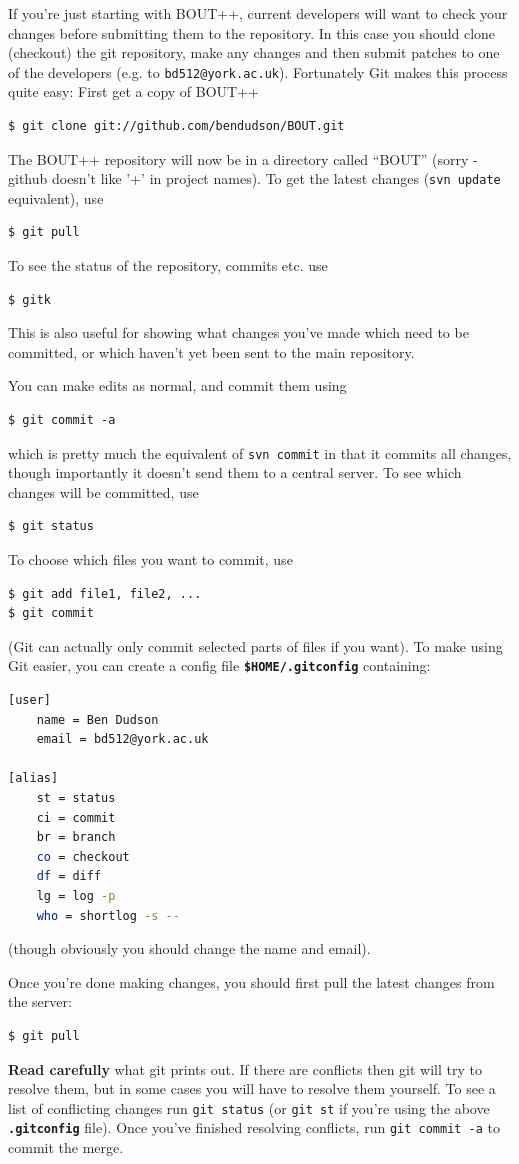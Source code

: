 \documentclass[12pt]{article}
\newcommand{\code}[1]{\texttt{#1}}
\newcommand{\file}[1]{\texttt{\bf #1}}
\begin{document}
If you're just starting with BOUT++, current developers will want to check
your changes before submitting them to the repository. In this case
you should clone (checkout) the git repository, make any changes and
then submit patches to one of the developers (e.g.
to \texttt{bd512@york.ac.uk}). Fortunately Git makes this process quite easy:
First get a copy of BOUT++
\begin{verbatim}
$ git clone git://github.com/bendudson/BOUT.git
\end{verbatim}
The BOUT++ repository will now be in a directory called ``BOUT''
(sorry - github doesn't like '+' in project names). To get the latest
changes (\code{svn update} equivalent), use
\begin{verbatim}
$ git pull
\end{verbatim}
To see the status of the repository, commits etc. use 
\begin{verbatim}
$ gitk
\end{verbatim}
This is also useful for showing what changes you've made which need to be
committed, or which haven't yet been sent to the main repository.

You can make edits as normal, and commit them using
\begin{verbatim}
$ git commit -a
\end{verbatim}
which is pretty much the equivalent of \code{svn commit} in that
it commits all changes, though importantly it doesn't send them to
a central server. To see which changes will be committed, use
\begin{verbatim}
$ git status
\end{verbatim}
To choose which files you want to commit, use 
\begin{verbatim}
$ git add file1, file2, ...
$ git commit
\end{verbatim}
(Git can actually only commit selected parts of files if you want). To 
make using Git easier, you can create a config file \file{\$HOME/.gitconfig}
containing:
\begin{lstlisting}[language=bash,numbers=none]
[user]
	name = Ben Dudson
	email = bd512@york.ac.uk

[alias]
	st = status
	ci = commit
	br = branch
	co = checkout
	df = diff
	lg = log -p
	who = shortlog -s --
\end{lstlisting}
(though obviously you should change the name and email).

Once you're done making changes, you should first pull the latest changes
from the server:
\begin{verbatim}
$ git pull
\end{verbatim}
{\bf Read carefully} what git prints out. If there are conflicts
then git will try to resolve them, but in some cases you will have 
to resolve them yourself. To see a list of conflicting changes
run \code{git status} (or \code{git st} if you're using the above
\file{.gitconfig} file). Once you've finished resolving conflicts,
run \code{git commit -a} to commit the merge.
\end{document}
